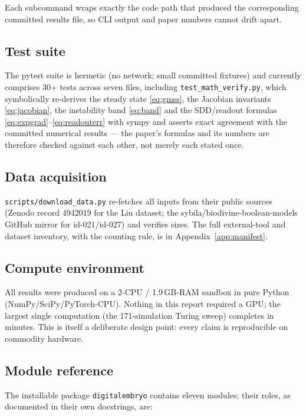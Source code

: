 Each subcommand wraps exactly the code path that produced the corresponding
committed results file, so CLI output and paper numbers cannot drift apart.

\subsection{Test suite}

The pytest suite is hermetic (no network; small committed fixtures) and
currently comprises 30+ tests across seven files, including
\texttt{test\_math\_verify.py}, which symbolically re-derives the steady
state \eqref{eq:gmss}, the Jacobian invariants \eqref{eq:jacobian}, the
instability band \eqref{eq:band} and the SDD/readout formulas
\eqref{eq:expgrad}--\eqref{eq:readouterr} with sympy and asserts exact
agreement with the committed numerical results --- the paper's formulas and
its numbers are therefore checked against each other, not merely each stated
once.

\subsection{Data acquisition}

\texttt{scripts/download\_data.py} re-fetches all inputs from their public
sources (Zenodo record 4942019 for the Liu dataset; the
sybila/biodivine-boolean-models GitHub mirror for id-021/id-027) and verifies
sizes. The full external-tool and dataset inventory, with the counting rule,
is in Appendix~\ref{app:manifest}.

\subsection{Compute environment}

All results were produced on a 2-CPU / 1.9\,GB-RAM sandbox in pure Python
(NumPy/SciPy/PyTorch-CPU). Nothing in this report required a GPU; the largest
single computation (the 171-simulation Turing sweep) completes in minutes.
This is itself a deliberate design point: every claim is reproducible on
commodity hardware.

\subsection{Module reference}

The installable package \texttt{digitalembryo} contains eleven modules; their
roles, as documented in their own docstrings, are:

